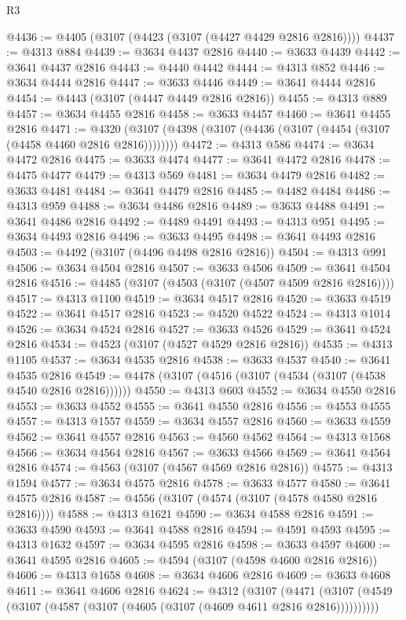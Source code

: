 \begin{lexlean}{R3}
\begin{coremodule}
@4436 := @4405 (@3107 (@4423 (@3107 (@4427 @4429 @2816 @2816))))
@4437 := @4313 @884
@4439 := @3634 @4437 @2816
@4440 := @3633 @4439
@4442 := @3641 @4437 @2816
@4443 := @4440 @4442
@4444 := @4313 @852
@4446 := @3634 @4444 @2816
@4447 := @3633 @4446
@4449 := @3641 @4444 @2816
@4454 := @4443 (@3107 (@4447 @4449 @2816 @2816))
@4455 := @4313 @889
@4457 := @3634 @4455 @2816
@4458 := @3633 @4457
@4460 := @3641 @4455 @2816
@4471 := @4320 (@3107 (@4398 (@3107 (@4436 (@3107 (@4454 (@3107 (@4458 @4460 @2816 @2816))))))))
@4472 := @4313 @586
@4474 := @3634 @4472 @2816
@4475 := @3633 @4474
@4477 := @3641 @4472 @2816
@4478 := @4475 @4477
@4479 := @4313 @569
@4481 := @3634 @4479 @2816
@4482 := @3633 @4481
@4484 := @3641 @4479 @2816
@4485 := @4482 @4484
@4486 := @4313 @959
@4488 := @3634 @4486 @2816
@4489 := @3633 @4488
@4491 := @3641 @4486 @2816
@4492 := @4489 @4491
@4493 := @4313 @951
@4495 := @3634 @4493 @2816
@4496 := @3633 @4495
@4498 := @3641 @4493 @2816
@4503 := @4492 (@3107 (@4496 @4498 @2816 @2816))
@4504 := @4313 @991
@4506 := @3634 @4504 @2816
@4507 := @3633 @4506
@4509 := @3641 @4504 @2816
@4516 := @4485 (@3107 (@4503 (@3107 (@4507 @4509 @2816 @2816))))
@4517 := @4313 @1100
@4519 := @3634 @4517 @2816
@4520 := @3633 @4519
@4522 := @3641 @4517 @2816
@4523 := @4520 @4522
@4524 := @4313 @1014
@4526 := @3634 @4524 @2816
@4527 := @3633 @4526
@4529 := @3641 @4524 @2816
@4534 := @4523 (@3107 (@4527 @4529 @2816 @2816))
@4535 := @4313 @1105
@4537 := @3634 @4535 @2816
@4538 := @3633 @4537
@4540 := @3641 @4535 @2816
@4549 := @4478 (@3107 (@4516 (@3107 (@4534 (@3107 (@4538 @4540 @2816 @2816))))))
@4550 := @4313 @603
@4552 := @3634 @4550 @2816
@4553 := @3633 @4552
@4555 := @3641 @4550 @2816
@4556 := @4553 @4555
@4557 := @4313 @1557
@4559 := @3634 @4557 @2816
@4560 := @3633 @4559
@4562 := @3641 @4557 @2816
@4563 := @4560 @4562
@4564 := @4313 @1568
@4566 := @3634 @4564 @2816
@4567 := @3633 @4566
@4569 := @3641 @4564 @2816
@4574 := @4563 (@3107 (@4567 @4569 @2816 @2816))
@4575 := @4313 @1594
@4577 := @3634 @4575 @2816
@4578 := @3633 @4577
@4580 := @3641 @4575 @2816
@4587 := @4556 (@3107 (@4574 (@3107 (@4578 @4580 @2816 @2816))))
@4588 := @4313 @1621
@4590 := @3634 @4588 @2816
@4591 := @3633 @4590
@4593 := @3641 @4588 @2816
@4594 := @4591 @4593
@4595 := @4313 @1632
@4597 := @3634 @4595 @2816
@4598 := @3633 @4597
@4600 := @3641 @4595 @2816
@4605 := @4594 (@3107 (@4598 @4600 @2816 @2816))
@4606 := @4313 @1658
@4608 := @3634 @4606 @2816
@4609 := @3633 @4608
@4611 := @3641 @4606 @2816
@4624 := @4312
    (@3107
      (@4471 (@3107 (@4549 (@3107 (@4587 (@3107 (@4605 (@3107 (@4609 @4611 @2816 @2816))))))))))

\end{coremodule}
\end{lexlean}
